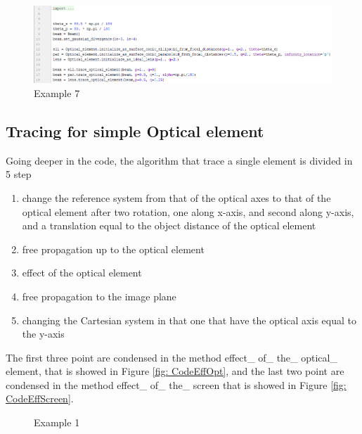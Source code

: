 \begin{figure}[H]
%
\centering
%
\includegraphics[width=1.\textwidth]{Immagini/Chapter3/CodeSystem}
%
\caption{Example 7}
%
\label{fig: CodeSystem}
%
\end{figure}
%
\subsection{Tracing for simple Optical element}
Going deeper in the code, the algorithm that trace a single element is divided in 5 step
\begin{enumerate}
	\item change the reference system from that of the optical axes to that of the optical element after two rotation, one along x-axis, and second along y-axis, and a translation equal to the object distance of the optical element
	\item free propagation up to the optical element
	\item effect of the optical element
	\item free propagation to the image plane
	\item changing the Cartesian system in that one that have the optical axis equal to the y-axis
\end{enumerate}
The first three point are condensed in the method effect\_ of\_ the\_ optical\_ element, that is showed in Figure \ref{fig: CodeEffOpt}, and the last two point are condensed in the method effect\_ of\_ the\_ screen that is showed in Figure \ref{fig: CodeEffScreen}.
\begin{figure}[H]
%
\centering
%
\quad
%
%
\caption{Example 1}
\label{fig :p1}
%
\end{figure}
